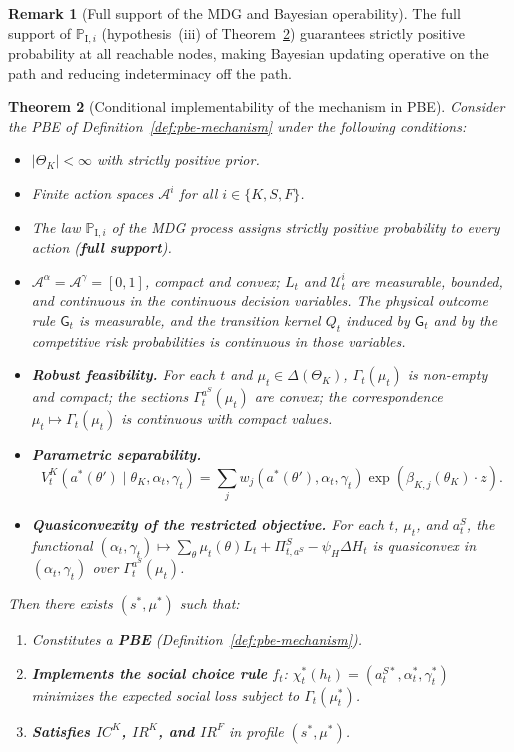 \documentclass[ecta,nameyear,final,supplement]{econsocart}
\numberwithin{equation}{section}
\numberwithin{table}{section}
\newtheorem{theorem}{Theorem}[section]
\theoremstyle{definition}
\newtheorem{remark}[theorem]{Remark}
\newcommand{\ProbI}[1]{\mathbb{P}_{\mathrm{I},#1}}
\begin{document}
\begin{remark}[Full support of the MDG and Bayesian operability]
The full support of $\ProbI{i}$ (hypothesis~(iii) of
Theorem~\ref{thm:ebp-implementabilidad}) guarantees strictly positive
probability at all reachable nodes, making Bayesian updating operative on the
path and reducing indeterminacy off the path.
\end{remark}

\bigskip

\begin{theorem}[Conditional implementability of the mechanism in PBE]
\label{thm:ebp-implementabilidad}
Consider the PBE of Definition~\ref{def:pbe-mechanism} under the
following conditions:
\begin{itemize}
  \item[\textup{(i)}] $|\Theta_K|<\infty$ with strictly positive prior.
  \item[\textup{(ii)}] Finite action spaces $\mathcal{A}^i$ for all
  $i\in\{K,S,F\}$.
  \item[\textup{(iii)}] The law $\ProbI{i}$ of the MDG process assigns strictly
  positive probability to every action (\textbf{full support}).
  \item[\textup{(iv)}] $\mathcal{A}^\alpha=\mathcal{A}^\gamma=[0,1]$,
  compact and convex; $L_t$ and $\mathcal{U}_t^i$ are measurable, bounded, and
  continuous in the continuous decision variables. The physical outcome rule
  $\mathsf{G}_t$ is measurable, and the transition kernel $Q_t$ induced by
  $\mathsf{G}_t$ and by the competitive risk probabilities is continuous in
  those variables.
  \item[\textup{(v)}] \textbf{Robust feasibility.}
  For each $t$ and $\mu_t\in\Delta(\Theta_K)$, $\Gamma_t(\mu_t)$ is non-empty
  and compact; the sections $\Gamma_t^{a^S}(\mu_t)$ are convex; the
  correspondence $\mu_t\mapsto\Gamma_t(\mu_t)$ is continuous with compact
  values.
  \item[\textup{(vi)}] \textbf{Parametric separability.}
  \[
  V^K_t(a^\ast(\theta')\mid\theta_K,\alpha_t,\gamma_t)
  =
  \sum_jw_j(a^\ast(\theta'),\alpha_t,\gamma_t)
  \exp(\beta_{K,j}(\theta_K)\cdot z).
  \]
  \item[\textup{(vii)}] \textbf{Quasiconvexity of the restricted objective.}
  For each $t$, $\mu_t$, and $a_t^S$, the functional
  $(\alpha_t,\gamma_t)\mapsto\sum_\theta\mu_t(\theta)L_t+\Pi^S_{t,a^S}
  -\psi_H\Delta H_t$ is quasiconvex in $(\alpha_t,\gamma_t)$ over
  $\Gamma_t^{a^S}(\mu_t)$.
\end{itemize}
Then there exists $(s^\ast,\mu^\ast)$ such that:
\begin{enumerate}
  \item[\textup{(a)}] Constitutes a \textbf{PBE}
  (Definition~\ref{def:pbe-mechanism}).
  \item[\textup{(b)}] \textbf{Implements the social choice rule} $f_t$:
  $\chi_t^\ast(h_t)=(a_t^{S\ast},\alpha_t^\ast,\gamma_t^\ast)$ minimizes the
  expected social loss subject to $\Gamma_t(\mu_t^\ast)$.
  \item[\textup{(c)}] \textbf{Satisfies $IC^K$, $IR^K$, and $IR^F$} in profile
  $(s^\ast,\mu^\ast)$.
\end{enumerate}
\end{theorem}
\end{document}
